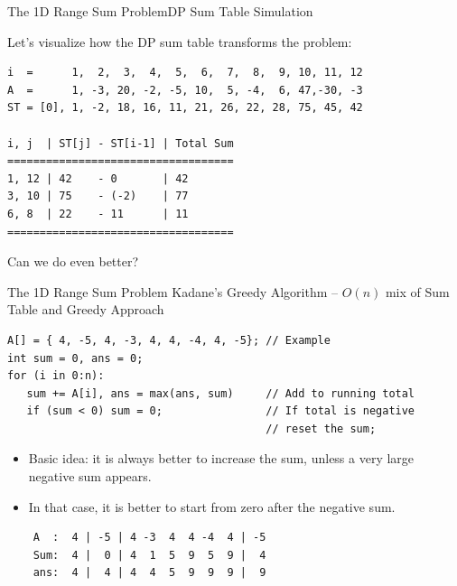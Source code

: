 \begin{frame}[fragile]{The 1D Range Sum Problem}{DP Sum Table Simulation}

  Let's visualize how the DP sum table transforms the problem:

{\smaller
\begin{verbatim}
i  =      1,  2,  3,  4,  5,  6,  7,  8,  9, 10, 11, 12
A  =      1, -3, 20, -2, -5, 10,  5, -4,  6, 47,-30, -3
ST = [0], 1, -2, 18, 16, 11, 21, 26, 22, 28, 75, 45, 42

i, j  | ST[j] - ST[i-1] | Total Sum
===================================
1, 12 | 42    - 0       | 42
3, 10 | 75    - (-2)    | 77
6, 8  | 22    - 11      | 11
===================================
\end{verbatim}
}
\bigskip

Can we do even better?
\end{frame}

\begin{frame}[fragile]{The 1D Range Sum Problem}
  {Kadane's Greedy Algorithm -- $O(n)$ mix of Sum Table and Greedy Approach}

  \begin{block}{}
      {\smaller
\begin{verbatim}
A[] = { 4, -5, 4, -3, 4, 4, -4, 4, -5}; // Example
int sum = 0, ans = 0;
for (i in 0:n):
   sum += A[i], ans = max(ans, sum)     // Add to running total
   if (sum < 0) sum = 0;                // If total is negative
                                        // reset the sum;
\end{verbatim}
      }
  \end{block}

\begin{itemize}
\item Basic idea: it is always better to increase the sum,
unless a very large negative sum appears.
\item In that case, it is better to start from zero after the negative sum.
\end{itemize}
\begin{verbatim}
    A  :  4 | -5 | 4 -3  4  4 -4  4 | -5
    Sum:  4 |  0 | 4  1  5  9  5  9 |  4
    ans:  4 |  4 | 4  4  5  9  9  9 |  9
\end{verbatim}
\end{frame}

